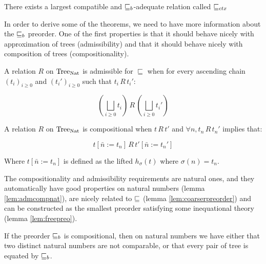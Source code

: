 \begin{adefinition}
    There exists a largest compatible and $\sqsubseteq_b$-adequate 
    relation called $\sqsubseteq_{ctx}$
\end{adefinition}

In order to derive some of the theorems, we need to have more information 
about the $\sqsubseteq_b$ preorder. One of the first properties is that 
it should behave nicely with approximation of trees (admissibility) and 
that it should behave nicely with composition of trees (compositionality).

\vspace{1em}

\begin{adefinition}[Admissibility]
    A relation $R$ on $\textnormal{Tree}_{\textnormal{Nat}}$ is admissible for $\sqsubseteq$ when 
    for every ascending chain $(t_i)_{i \geq 0}$ and 
    $(t_i')_{i\geq 0}$ such that $t_i \, R \, t_i'$:

    \[
        \left(\bigsqcup_{i \geq 0} t_i\right) \, R \, \left(\bigsqcup_{i \geq 0} t_i'\right)
    \]
\end{adefinition}

\begin{adefinition}[Compositionality]
    A relation $R$ on $\textnormal{Tree}_{\textnormal{Nat}}$ is compositional when 
    $t \, R \, t'$ and $\forall n, t_n \, R \, t_n'$ 
    implies that:
    
    \[
        t[ \bar{n} := t_n] \, R \, t'[ \bar{n} := t_n']
    \]

    Where $t[ \bar{n} := t_n]$ is defined as the lifted 
    $h_\sigma (t)$
    where $\sigma (n) = t_n$.
\end{adefinition}

The compositionality and admissibility requirements are 
natural ones, and they automatically have good properties 
on natural numbers (lemma \ref{lem:admcompnat}),
are nicely related to $\sqsubseteq$ (lemma \ref{lem:coarserpreorder})
and can be constructed as the smallest preorder 
satisfying some inequational theory (lemma \ref{lem:freepreo}).

\begin{alemma}
    \label{lem:admcompnat}
    If the preorder $\sqsubseteq_b$ is  
    compositional, then on natural 
    numbers we have either that two distinct 
    natural numbers are not comparable, 
    or that every pair of tree is equated  
    by $\sqsubseteq_b$.
\end{alemma}


